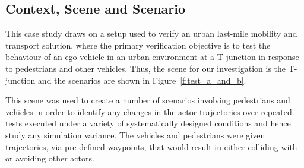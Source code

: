 \documentclass[letterpaper, 10 pt, journal, twoside]{IEEEtran}
\begin{document}

\subsection{Context, Scene and Scenario}\label{TestsDescriptionAndTechnicalities}

This case study draws on a setup used to verify an urban last-mile mobility and transport solution, where the primary verification objective is to test the behaviour of an ego vehicle in an urban environment at a T-junction in response to pedestrians and other vehicles.
%
Thus, the scene for our investigation is the T-junction and the scenarios are shown in Figure~\ref{f:test_a_and_b}.

This scene was used to create a number of scenarios involving pedestrians and vehicles in order to identify any changes in the actor trajectories over repeated tests executed under a variety of systematically designed conditions and hence study any simulation variance.
%
The vehicles and pedestrians were given trajectories, via pre-defined waypoints, that would result in either colliding with or avoiding other actors.
\end{document}
